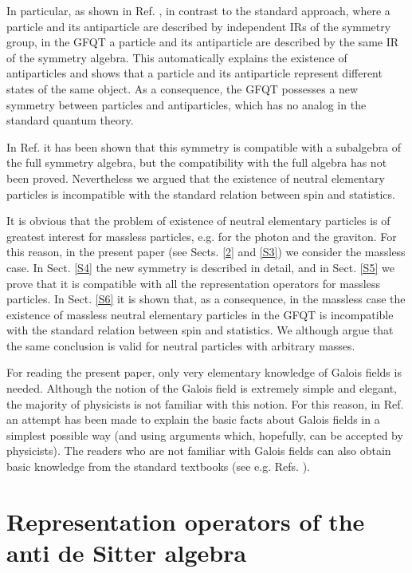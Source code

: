 \documentclass[a4paper,12pt]{article}%
\begin{document}
In particular, as shown in Ref. \cite{lev2}, in contrast to 
the standard approach, where a particle and its
antiparticle are described by independent IRs of the symmetry 
group, in the GFQT a particle and its antiparticle are 
described by the same IR of the symmetry algebra. This
automatically explains the existence of antiparticles and
shows that a particle and its antiparticle represent
different states of the same object. As a consequence, the 
GFQT possesses a new symmetry between particles and 
antiparticles, which has no analog in
the standard quantum theory. 

In Ref. \cite{lev2} it has been
shown that this symmetry is compatible with a subalgebra of the
full symmetry algebra, but the compatibility with the full
algebra has not been proved. Nevertheless we argued that
the existence of neutral elementary particles is
incompatible with the standard relation between spin and
statistics.

It is obvious that the problem of existence of neutral 
elementary particles is of greatest interest for massless
particles, e.g. for the photon and the graviton. For this
reason, in the present paper (see Sects. \ref{2} and \ref{S3})
we consider the massless case. In Sect. \ref{S4} the 
new symmetry is described in 
detail, and in Sect. \ref{S5} we prove that it is 
compatible with all the representation operators for
massless particles. In Sect. \ref{S6} it is shown that,
as a consequence, in the massless case the existence
of massless neutral elementary particles in the GFQT 
is incompatible with the standard relation between spin 
and statistics. We although argue that the
same conclusion is valid for neutral particles with
arbitrary masses.

For reading the present paper, only very elementary 
knowledge of Galois fields is needed. Although the
notion of the Galois field is extremely simple and
elegant, the majority of physicists is not familiar with
this notion. For this reason, in Ref. \cite{lev2} an
attempt has been made to explain the basic facts about
Galois fields in a simplest possible way (and using
arguments which, hopefully, can be accepted by physicists). 
The readers who are not familiar with Galois fields can 
also obtain basic knowledge from the standard textbooks
(see e.g. Refs. \cite{VDW,IR}). 
 
\section{Representation operators of the anti de Sitter algebra}
\label{S2}
\end{document}
